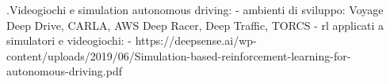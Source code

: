 .Videogiochi e simulation autonomous driving:
	- ambienti di sviluppo:  Voyage Deep Drive, CARLA, AWS Deep Racer, Deep Traffic, TORCS	
	- rl applicati a simulatori e videogiochi:
		- https://deepsense.ai/wp-content/uploads/2019/06/Simulation-based-reinforcement-learning-for-autonomous-driving.pdf
	
	
	
	
	
	
